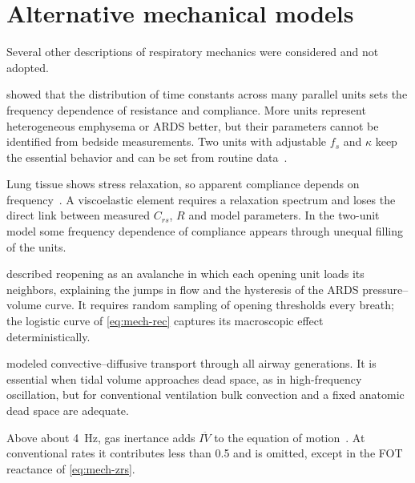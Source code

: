 \section{Alternative mechanical models}
\label{sec:mech-alt}
Several other descriptions of respiratory mechanics were considered and not adopted.
\begin{description}[leftmargin=1em]
  \item[$N$ parallel units.] \citet{otis1956} showed that the distribution of time constants across many parallel units sets the frequency dependence of resistance and compliance. More units represent heterogeneous emphysema or ARDS better, but their parameters cannot be identified from bedside measurements. Two units with adjustable $f_s$ and $\kappa$ keep the essential behavior and can be set from routine data~\citep{bates1985}.
  \item[Viscoelastic tissue.] Lung tissue shows stress relaxation, so apparent compliance depends on frequency~\citep{hildebrandt1969,fredberg1989}. A viscoelastic element requires a relaxation spectrum and loses the direct link between measured $C_{rs}$, $R$ and model parameters. In the two-unit model some frequency dependence of compliance appears through unequal filling of the units.
  \item[Avalanche recruitment.] \citet{suki1994} described reopening as an avalanche in which each opening unit loads its neighbors, explaining the jumps in flow and the hysteresis of the ARDS pressure--volume curve. It requires random sampling of opening thresholds every breath; the logistic curve of \cref{eq:mech-rec} captures its macroscopic effect deterministically.
  \item[Airway-tree transport.] \citet{pedley1970} modeled convective--diffusive transport through all airway generations. It is essential when tidal volume approaches dead space, as in high-frequency oscillation, but for conventional ventilation bulk convection and a fixed anatomic dead space are adequate.
  \item[Inertance.] Above about \SI{4}{\hertz}, gas inertance adds $I\ddot V$ to the equation of motion~\citep{bates2009a}. At conventional rates it contributes less than \SI{0.5}{\cmH} and is omitted, except in the FOT reactance of \cref{eq:mech-zrs}.
\end{description}


